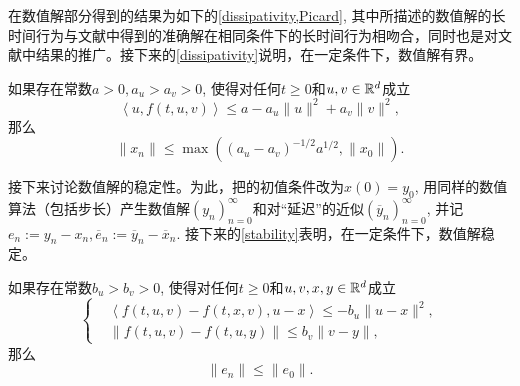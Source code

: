 在数值解部分得到的结果为如下的\cref{dissipativity,Picard}, 其中所描述的数值解的长时间行为与文献中得到的准确解在相同条件下的长时间行为相吻合，同时也是对文献中结果的推广。接下来的\cref{dissipativity}说明，在一定条件下，数值解有界。
\begin{theorem}\label{dissipativity}
    如果存在常数$a>0,a_u>a_v>0$, 使得对任何$t\geqslant 0$和$u,v\in \mathbb{R}^d$成立
    \begin{equation*}
        \left<u,f(t,u,v)\right>\leqslant a-a_u \|u\|^2+a_v \|v\|^2,
    \end{equation*}
    那么
    \begin{equation}\label{耗散性结果}
        \|x_n\|\leqslant \max\left(\left(a_u-a_v\right)^{-1/2}a^{1/2},\|x_0\|\right).
    \end{equation}
\end{theorem}
接下来讨论数值解的稳定性。为此，把\mainEquation 的初值条件改为$x(0)=y_0$, 用同样的数值算法（包括步长）产生数值解$\left(y_n\right)_{n=0}^\infty$和对“延迟”的近似$\left(\overline y_n\right)_{n=0}^\infty$, 并记$e_n:=y_n-x_n, \overline e_n:=\overline y_n-\overline x_n$. 接下来的\cref{stability}表明，在一定条件下，数值解稳定。
\begin{theorem}\label{stability}
    如果存在常数$b_u>b_v>0$, 使得对任何$t\geqslant 0$和$u,v,x,y\in \mathbb{R}^d$成立
    \begin{equation*}
        \left\{
            \begin{aligned}
                &\left<f(t,u,v)-f(t,x,v),u-x\right>\leqslant -b_u \|u-x\|^2,
                \\ &\|f(t,u,v)-f(t,u,y)\|\leqslant b_v \|v-y\|,
            \end{aligned}
        \right.
    \end{equation*}
    那么
    \begin{equation*}
        \|e_n\|\leqslant \|e_0\|.
    \end{equation*}
\end{theorem}